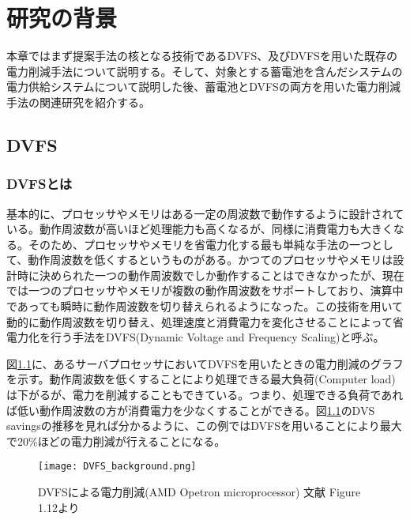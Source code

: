 \chapter{研究の背景}
\label{chap:background}

本章ではまず提案手法の核となる技術であるDVFS、及びDVFSを用いた既存の電力削減手法について説明する。そして、対象とする蓄電池を含んだシステムの電力供給システムについて説明した後、蓄電池とDVFSの両方を用いた電力削減手法の関連研究を紹介する。

\section{DVFS}
\label{sec:dvfs}

\subsection{DVFSとは}

基本的に、プロセッサやメモリはある一定の周波数で動作するように設計されている。動作周波数が高いほど処理能力も高くなるが、同様に消費電力も大きくなる。そのため、プロセッサやメモリを省電力化する最も単純な手法の一つとして、動作周波数を低くするというものがある。かつてのプロセッサやメモリは設計時に決められた一つの動作周波数でしか動作することはできなかったが、現在では一つのプロセッサやメモリが複数の動作周波数をサポートしており、演算中であっても瞬時に動作周波数を切り替えられるようになった。この技術を用いて動的に動作周波数を切り替え、処理速度と消費電力を変化させることによって省電力化を行う手法をDVFS(Dynamic Voltage and Frequency Scaling)と呼ぶ。

図\ref{fig:dvfs_background}に、あるサーバプロセッサにおいてDVFSを用いたときの電力削減のグラフを示す\cite{Hennessy:2011:CAF:1999263}。動作周波数を低くすることにより処理できる最大負荷(Computer load)は下がるが、電力を削減することもできている。つまり、処理できる負荷であれば低い動作周波数の方が消費電力を少なくすることができる。図\ref{fig:dvfs_background}のDVS savingsの推移を見れば分かるように、この例ではDVFSを用いることにより最大で20\%ほどの電力削減が行えることになる。
\begin{figure}[t]
 \begin{center}
  \texttt{[image: DVFS\_background.png]}
 \end{center}
 \caption{DVFSによる電力削減(AMD Opetron microprocessor) 文献\cite{Hennessy:2011:CAF:1999263} Figure 1.12より}
 \label{fig:dvfs_background}
\end{figure}



